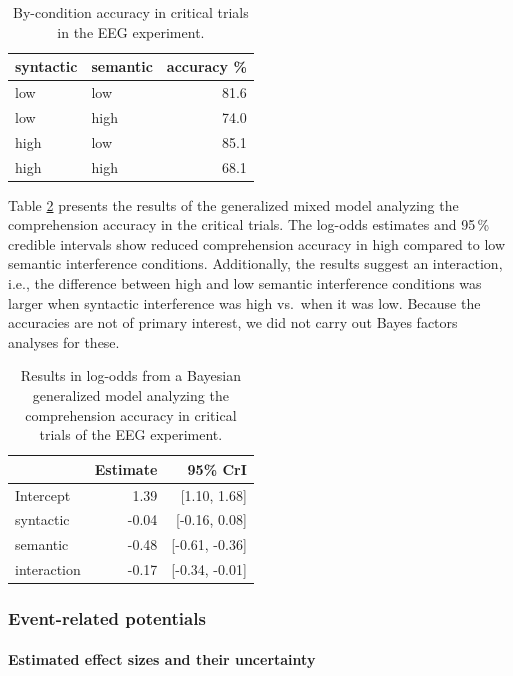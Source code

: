 \documentclass[a4paper, man, floatsintext]{apa7}
\begin{document}
\begin{table}[]
    \caption{By-condition accuracy in critical trials in the EEG experiment.}
    \label{tab:eeg_acc}
    \centering
    \begin{tabular}{llr}
    \toprule
    syntactic & semantic & accuracy \%\\
    \midrule
        low &  low & 81.6\\
        low &  high & 74.0\\
        high &  low & 85.1\\
        high &  high & 68.1\\
    \bottomrule
    \end{tabular}
\end{table}

Table \ref{tab:eeg_acc_mod} presents the results of the generalized mixed model analyzing the comprehension accuracy in the critical trials. The log-odds estimates and 95\,\% credible intervals show reduced comprehension accuracy in high compared to low semantic interference conditions. Additionally, the results suggest an interaction, i.e., the difference between high and low semantic interference conditions was larger when syntactic interference was high vs.\ when it was low. Because the accuracies are not of primary interest, we did not carry out Bayes factors analyses for these.

\begin{table}[]
    \caption{Results in log-odds from a Bayesian generalized model analyzing the comprehension accuracy in critical trials of the EEG experiment.}
    \label{tab:eeg_acc_mod}
    \centering
    \begin{tabular}{lrr}
    \toprule
    & Estimate &  95\% CrI  \\
    \midrule
Intercept& 1.39 &   [1.10, 1.68]\\
syntactic& -0.04 &  [-0.16, 0.08]\\
semantic&  -0.48 & [-0.61, -0.36]\\
interaction& -0.17&  [-0.34, -0.01]\\
    \bottomrule
    \end{tabular}
\end{table}

\subsubsection{Event-related potentials}

\paragraph{Estimated effect sizes and their uncertainty}
\end{document}
